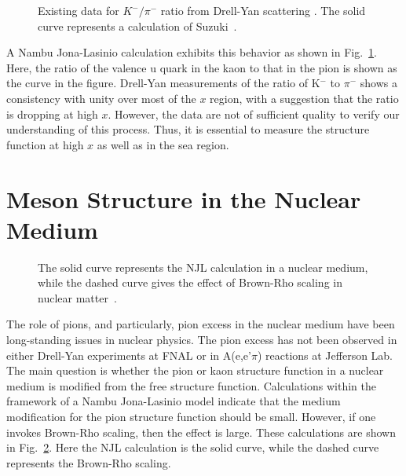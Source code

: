 \begin{figure} %
\centerline{}
\caption{Existing data for $K^-/\pi^-$ ratio from Drell-Yan
         scattering \protect\cite{badier}.  The solid curve represents
         a calculation of Suzuki~\protect\cite{suzuki,shigetani}. }
\label{fig2}
\end{figure}

A Nambu Jona-Lasinio calculation\cite{shigetani,davidson} exhibits this
behavior as shown in Fig.~\ref{fig2}.  Here, the ratio of the valence
u quark in the kaon to that in the pion is shown as the curve in the
figure.  Drell-Yan measurements\cite{badier} of the ratio of K$^-$ to
$\pi^-$ shows a consistency with unity over most of the $x$ region, with
a suggestion that the ratio is dropping at high $x$.  However, the data
are not of sufficient quality to verify our understanding of this
process.  Thus, it is essential to measure the structure function at
high $x$ as well as in the sea region.

\section*{Meson Structure in the Nuclear Medium}

\begin{figure} %
\centerline{}


\caption{The solid curve represents the NJL calculation in
a nuclear medium, while the dashed curve gives the effect of 
Brown-Rho scaling in nuclear matter~\protect\cite{suzuki}.}

\label{fig3}
\end{figure}

The role of pions, and particularly, pion excess in the nuclear medium
have been long-standing issues in nuclear physics.  The pion excess
has not been observed in either Drell-Yan experiments \cite{drellyan}
at FNAL or in A(e,e'$\pi$) reactions\cite{jackson} at Jefferson Lab.
The main question is whether the pion or kaon structure function in a
nuclear medium is modified from the free structure function.
Calculations within the framework of a Nambu Jona-Lasinio
model\cite{suzuki} indicate that the medium modification for the pion
structure function should be small.  However, if one invokes Brown-Rho
scaling\cite{brown}, then the effect is large.  These calculations are
shown in Fig.~\ref{fig3}.  Here the NJL calculation is the solid
curve, while the dashed curve represents the Brown-Rho scaling.

